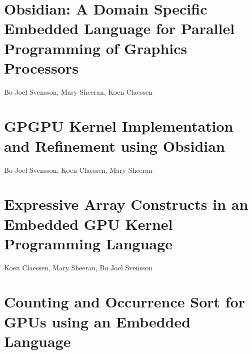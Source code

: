 \documentclass[a4paper]{book}
\newcommand{\paperIFL}{Obsidian: A Domain Specific Embedded Language for Parallel Programming of Graphics Processors}
\newcommand{\paperPAPP}{GPGPU Kernel Implementation and Refinement using Obsidian}
\newcommand{\paperEXPRESSIVE}{Expressive Array Constructs in an Embedded GPU Kernel Programming Language}
\newcommand{\paperCSORT}{Counting and Occurrence Sort for GPUs using an Embedded Language}
\begin{document}
\section{\paperIFL}
\label{sec:paperIFL}

\begin{center} 
Bo Joel Svensson, Mary Sheeran, Koen Claessen
\end{center}



% 
\cleardoublepage 

\section{\paperPAPP}
\label{sec:paperPAPP}

\begin{center} 
Bo Joel Svensson, Koen Claessen, Mary Sheeran
\end{center}




% 
\cleardoublepage 

\section{\paperEXPRESSIVE}
\label{sec:paperEXPRESSIVE}

\begin{center} 
Koen Claessen, Mary Sheeran, Bo Joel Svensson
\end{center}



% 
\cleardoublepage 

\section{\paperCSORT}
\label{sec:paperCSORT}
\end{document}
